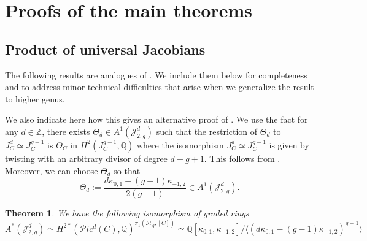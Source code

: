 \documentclass[11pt]{amsart}
\newcommand\Z{\mathbb{Z}}
\newtheorem{theorem}{Theorem}[section]
\theoremstyle{definition}
\newcommand{\jac}{\mathcal{J}}
\newcommand{\Q}{\mathbb{Q}}
\newcommand{\ka}{\kappa}
\newcommand{\T}{\Theta}
\begin{document}
\section{Proofs of the main theorems}\label{sec:conj-hyp}
\subsection{Product of universal Jacobians}
The following results are analogues of \cite[Theorem 4.4]{shubham-r2}. We include them below for completeness and to address minor technical difficulties that arise when we generalize the result to higher genus.

We also indicate here how this gives an alternative proof of \cite[Theorem 1.1]{larson-24}. We use the fact for any $d\in\Z$, there exists $\T_d\in A^1(\jac^d_{2,g})$ such that the restriction of $\T_d$ to $J^d_C\simeq J^{g-1}_C$ is $\T_C$ in $H^2(J^{g-1}_C,\Q)$ where the isomorphism $J^d_C\simeq J^{g-1}_C$ is given by twisting with an arbitrary divisor of degree $d-g+1$. This follows from \cite[Corollary 6.3(ii)]{melo}. Moreover, we can choose $\Theta_d$ so that
\begin{equation} \label{defintion of Theta_d}\T_d := \dfrac{d\ka_{0,1}-(g-1)\ka_{-1,2}}{2(g-1)}\in A^1(\jac^d_{2,g}).\end{equation}
\begin{theorem}\cite[Theorem 1.1]{larson-24} \label{simpler proof of Larson}
    We have the following isomorphism of graded rings \begin{equation*}
        A^* (\mathscr J^d_{2,g}) \simeq H^{2*} (\mathscr Pic^d(C),\mathbb Q)^{\pi_1(\mathcal H_g,[C])} \simeq  \mathbb Q[\kappa_{0,1},\kappa_{-1,2}] / \langle (d\kappa_{0,1} - (g-1)\kappa_{-1,2})^{g+1} \rangle 
    \end{equation*}
\end{theorem}
\end{document}
